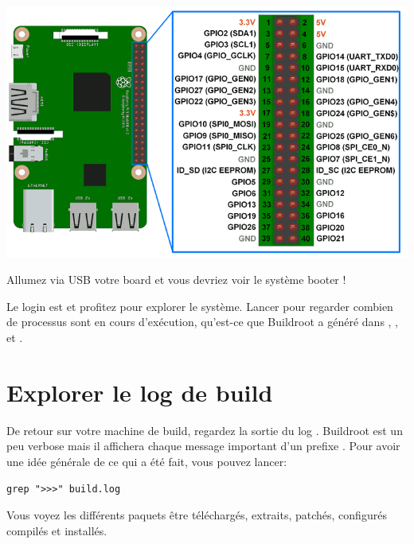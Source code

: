 \begin{centering}
  \includegraphics[height=0.5\textheight]{pictures/04_labs/rpi3_gpio_layout.png} \\
\end{centering}

Allumez via USB votre board et vous devriez voir le système booter !

Le login est  et profitez pour explorer le système. Lancer
 pour regarder combien de processus sont en cours d'exécution,
qu'est-ce que Buildroot a généré dans , , 
et .

\section{Explorer le log de build}

De retour sur votre machine de build, regardez la sortie du log .
Buildroot est un peu verbose mais il affichera chaque message important d'un
prefixe \code{>>>}. Pour avoir une idée générale de ce qui a été fait, vous
pouvez lancer:

\begin{verbatim}
grep ">>>" build.log
\end{verbatim}

Vous voyez les différents paquets être téléchargés, extraits, patchés,
configurés compilés et installés.
